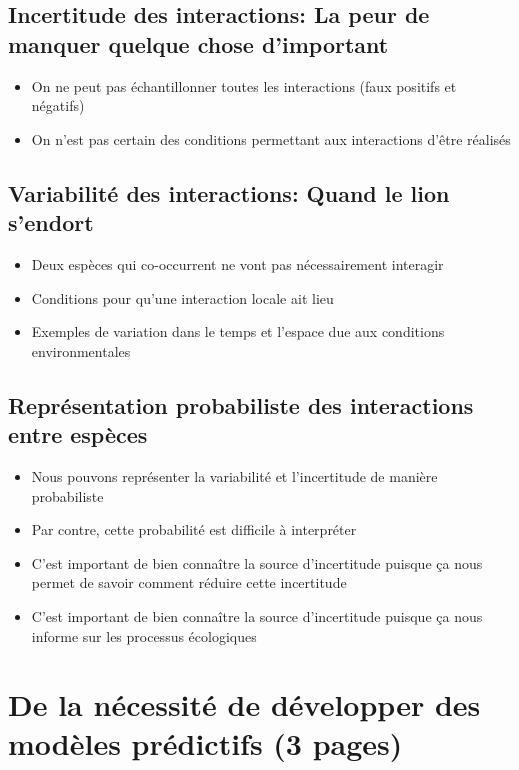 \subsection{Incertitude des interactions: La peur de manquer quelque chose d'important} 

\begin{itemize}
    \item On ne peut pas échantillonner toutes les interactions (faux positifs et négatifs)
    \item On n'est pas certain des conditions permettant aux interactions d'être réalisés
\end{itemize}

\subsection{Variabilité des interactions: Quand le lion s'endort} 

\begin{itemize}
    \item Deux espèces qui co-occurrent ne vont pas nécessairement interagir
    \item Conditions pour qu'une interaction locale ait lieu 
    \item Exemples de variation dans le temps et l'espace due aux conditions environmentales 
\end{itemize}

\subsection{Représentation probabiliste des interactions entre espèces} 

\begin{itemize}
    \item Nous pouvons représenter la variabilité et l'incertitude de manière probabiliste
    \item Par contre, cette probabilité est difficile à interpréter 
    \item C'est important de bien connaître la source d'incertitude puisque ça nous permet de savoir comment réduire cette incertitude
    \item C'est important de bien connaître la source d'incertitude puisque ça nous informe sur les processus écologiques 
\end{itemize}


\section{De la nécessité de développer des modèles prédictifs (3 pages)} 

